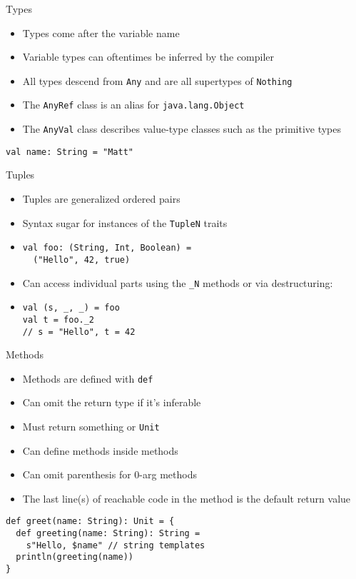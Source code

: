 \documentclass{beamer}
\begin{document}
\begin{frame}[fragile]{Types}
\begin{itemize}
\item Types come after the variable name
\item Variable types can oftentimes be inferred by the compiler
\item All types descend from \lstinline{Any} and are all supertypes of \lstinline{Nothing}
\item The \lstinline{AnyRef} class is an alias for \lstinline{java.lang.Object}
\item The \lstinline{AnyVal} class describes value-type classes such as the primitive types
\end{itemize}
\begin{lstlisting}
val name: String = "Matt"
\end{lstlisting}
\end{frame}

\begin{frame}[fragile]{Tuples}
\begin{itemize}
\item Tuples are generalized ordered pairs
\item Syntax sugar for instances of the \lstinline{TupleN} traits
\item
\begin{lstlisting}
val foo: (String, Int, Boolean) =
  ("Hello", 42, true)
\end{lstlisting}
\item Can access individual parts using the \lstinline{_N} methods or via destructuring:
\item
\begin{lstlisting}
val (s, _, _) = foo
val t = foo._2
// s = "Hello", t = 42
\end{lstlisting}
\end{itemize}
\end{frame}

\begin{frame}[fragile]{Methods}
\begin{itemize}
\item Methods are defined with \lstinline{def}
\item Can omit the return type if it's inferable
\item Must return something or \lstinline{Unit}
\item Can define methods inside methods
\item Can omit parenthesis for 0-arg methods
\item The last line(s) of reachable code in the method is the default return value
\end{itemize}
\begin{lstlisting}
def greet(name: String): Unit = {
  def greeting(name: String): String =
    s"Hello, $name" // string templates
  println(greeting(name))
}
\end{lstlisting}
\end{frame}
\end{document}
